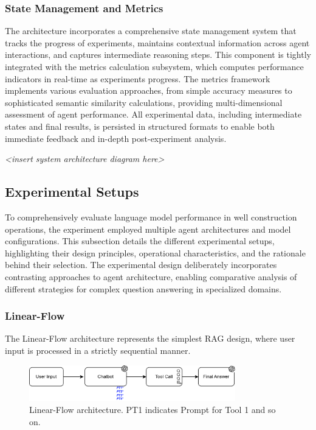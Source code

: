             \subsubsection{State Management and Metrics}

                The architecture incorporates a comprehensive state management system that tracks the progress of experiments, maintains contextual information across agent interactions, and captures intermediate reasoning steps. This component is tightly integrated with the metrics calculation subsystem, which computes performance indicators in real-time as experiments progress. The metrics framework implements various evaluation approaches, from simple accuracy measures to sophisticated semantic similarity calculations, providing multi-dimensional assessment of agent performance. All experimental data, including intermediate states and final results, is persisted in structured formats to enable both immediate feedback and in-depth post-experiment analysis.

                \textit{<insert system architecture diagram here>}

        \subsection{Experimental Setups}

            To comprehensively evaluate language model performance in well construction operations, the experiment employed multiple agent architectures and model configurations. This subsection details the different experimental setups, highlighting their design principles, operational characteristics, and the rationale behind their selection. The experimental design deliberately incorporates contrasting approaches to agent architecture, enabling comparative analysis of different strategies for complex question answering in specialized domains.
            

            \subsubsection{Linear-Flow}

                The Linear-Flow architecture represents the simplest RAG design, where user input is processed in a strictly sequential manner. 

                \begin{figure}[h]
                    \centering
                    \includegraphics[width=0.8\textwidth]{images_exp2/diagrama_linear_flow.png}
                    \caption{Linear-Flow architecture. PT1 indicates Prompt for Tool 1 and so on.}
                    \label{fig:diagrama_linear_flow}
                \end{figure}
           

